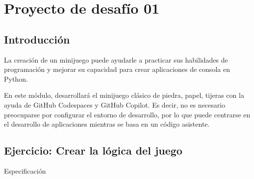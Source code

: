 \section{Proyecto de desafío 01}


\subsection{Introducción}

La creación de un minijuego puede ayudarle a practicar sus habilidades de programación y mejorar 
su capacidad para crear aplicaciones de consola en Python.

En este módulo, desarrollará el minijuego clásico de piedra, papel, tijeras con la ayuda de 
GitHub Codespaces y GitHub Copilot. Es decir, no es necesario preocuparse por configurar el 
entorno de desarrollo, por lo que puede centrarse en el desarrollo de aplicaciones mientras 
se basa en un código asistente.


\subsection{Ejercicio: Crear la lógica del juego}

Especificación

